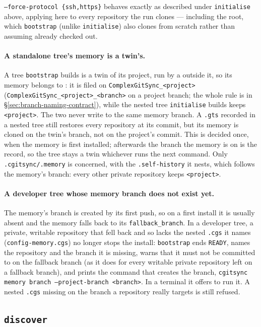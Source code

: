 \texttt{--force-protocol \{ssh,https\}} behaves exactly as described under
\texttt{initialise} above, applying here to every repository the run
clones --- including the root, which \texttt{bootstrap} (unlike
\texttt{initialise}) also clones from scratch rather than assuming already
checked out.

\paragraph{A standalone tree's memory is a twin's.} A tree \texttt{bootstrap}
builds is a twin of its project, run by a \cgspkg{} outside it, so its
memory belongs to \cgspkg{}: it is filed on \texttt{ComplexGitSync\_<project>}
(\texttt{ComplexGitSync\_<project>\_<branch>} on a project branch; the whole rule is
in \S\ref{sec:branch-naming-contract}), while the
nested tree \texttt{initialise} builds keeps \texttt{<project>}. The two never
write to the same memory branch. A \texttt{.gts} recorded in a nested tree
still restores every repository at its commit, but its memory is cloned on the
twin's branch, not on the project's commit. This is decided once, when the
memory is first installed; afterwards the branch the memory is on is the
record, so the tree stays a twin whichever \cgspkg{} runs the next command.
Only \texttt{.cgitsync/.memory} is concerned, with the
\texttt{.self-history} it nests, which follows the memory's branch: every
other private repository keeps \texttt{<project>}.

\paragraph{A developer tree whose memory branch does not exist yet.} The
memory's branch is created by its first push, so on a first install it is
usually absent and the memory falls back to its \texttt{fallback\_branch}. In
a developer tree, a private, writable repository that fell back and so lacks
the nested \texttt{.cgs} it names (\texttt{config-memory.cgs}) no longer stops
the install: \texttt{bootstrap} ends \texttt{READY}, names the repository and
the branch it is missing, warns that it must not be committed to on the
fallback branch (as it does for every writable private repository left on a
fallback branch), and prints the command that creates the branch,
\texttt{cgitsync memory branch --project-branch <branch>}. In a terminal it
offers to run it. A nested \texttt{.cgs} missing on the branch a repository
really targets is still refused.

\subsection{\texttt{discover}}

